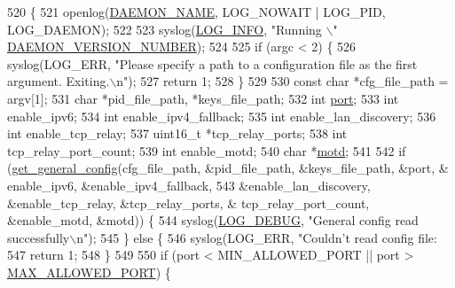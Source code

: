 \begin{DoxyCode}
520 \{
521     openlog(\hyperlink{tox-bootstrapd_8c_a5ea777c6fb1dd39fda46cdf97a6949a5}{DAEMON\_NAME}, LOG\_NOWAIT | LOG\_PID, LOG\_DAEMON);
522 
523     syslog(\hyperlink{logger_8h_aa5a9053636a30269210c54e734e0d583a6e98ff471e3ce6c4ef2d75c37ee51837}{LOG\_INFO}, \textcolor{stringliteral}{"Running \(\backslash\)"%
      \hyperlink{tox-bootstrapd_8c_a63112447ca129c284247c8b29b32b838}{DAEMON\_VERSION\_NUMBER});
524 
525     \textcolor{keywordflow}{if} (argc < 2) \{
526         syslog(LOG\_ERR, \textcolor{stringliteral}{"Please specify a path to a configuration file as the first argument. Exiting.\(\backslash\)n"});
527         \textcolor{keywordflow}{return} 1;
528     \}
529 
530     \textcolor{keyword}{const} \textcolor{keywordtype}{char} *cfg\_file\_path = argv[1];
531     \textcolor{keywordtype}{char} *pid\_file\_path, *keys\_file\_path;
532     \textcolor{keywordtype}{int} \hyperlink{irc__syncbot_8c_a8e0798404bf2cf5dabb84c5ba9a4f236}{port};
533     \textcolor{keywordtype}{int} enable\_ipv6;
534     \textcolor{keywordtype}{int} enable\_ipv4\_fallback;
535     \textcolor{keywordtype}{int} enable\_lan\_discovery;
536     \textcolor{keywordtype}{int} enable\_tcp\_relay;
537     uint16\_t *tcp\_relay\_ports;
538     \textcolor{keywordtype}{int} tcp\_relay\_port\_count;
539     \textcolor{keywordtype}{int} enable\_motd;
540     \textcolor{keywordtype}{char} *\hyperlink{namespacebootstrap__node__info_aa2d2b1afbc1ef82443acef646943f3fe}{motd};
541 
542     \textcolor{keywordflow}{if} (\hyperlink{tox-bootstrapd_8c_a6d074c4305e232b55bc9894bef6dc957}{get\_general\_config}(cfg\_file\_path, &pid\_file\_path, &keys\_file\_path, &port, &
      enable\_ipv6, &enable\_ipv4\_fallback,
543                            &enable\_lan\_discovery, &enable\_tcp\_relay, &tcp\_relay\_ports, &
      tcp\_relay\_port\_count, &enable\_motd, &motd)) \{
544         syslog(\hyperlink{logger_8h_aa5a9053636a30269210c54e734e0d583ab9f002c6ffbfd511da8090213227454e}{LOG\_DEBUG}, \textcolor{stringliteral}{"General config read successfully\(\backslash\)n"});
545     \} \textcolor{keywordflow}{else} \{
546         syslog(LOG\_ERR, \textcolor{stringliteral}{"Couldn't read config file: %
547         \textcolor{keywordflow}{return} 1;
548     \}
549 
550     \textcolor{keywordflow}{if} (port < MIN\_ALLOWED\_PORT || port > \hyperlink{tox-bootstrapd_8c_a83828e6f5b4b788b1781b298a3a221cd}{MAX\_ALLOWED\_PORT}) \{
}}
\end{DoxyCode}
